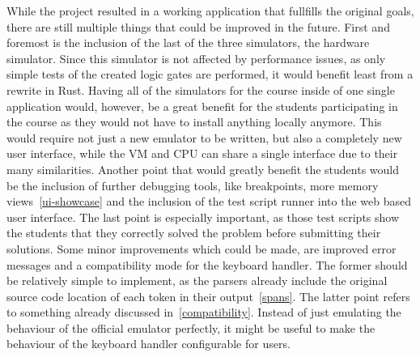 \label{future-work}
While the project resulted in a working application that fullfills the original goals, there are still multiple things that could be improved in the future.
First and foremost is the inclusion of the last of the three simulators, the hardware simulator. Since this simulator is not affected by performance issues, as only simple tests of the created logic gates are performed, it would benefit least from a rewrite in Rust. Having all of the simulators for the course inside of one single application would, however, be a great benefit for the students participating in the course as they would not have to install anything locally anymore.
This would require not just a new emulator to be written, but also a completely new user interface, while the VM and CPU can share a single interface due to their many similarities.
Another point that would greatly benefit the students would be the inclusion of further debugging tools, like breakpoints, more memory views~\ref{ui-showcase} and the inclusion of the test script runner into the web based user interface.
The last point is especially important, as those test scripts show the students that they correctly solved the problem before submitting their solutions.
Some minor improvements which could be made, are improved error messages and a compatibility mode for the keyboard handler.
The former should be relatively simple to implement, as the parsers already include the original source code location of each token in their output~\ref{spans}.
The latter point refers to something already discussed in~\cref{compatibility}. Instead of just emulating the behaviour of the official emulator perfectly, it might be useful to make the behaviour of the keyboard handler configurable for users.

